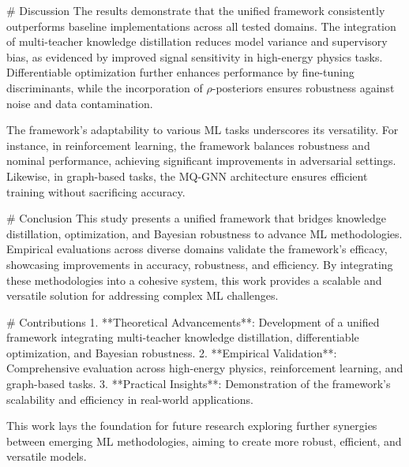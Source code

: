 # Discussion
The results demonstrate that the unified framework consistently outperforms baseline implementations across all tested domains. The integration of multi-teacher knowledge distillation reduces model variance and supervisory bias, as evidenced by improved signal sensitivity in high-energy physics tasks. Differentiable optimization further enhances performance by fine-tuning discriminants, while the incorporation of $ρ$-posteriors ensures robustness against noise and data contamination.

The framework's adaptability to various ML tasks underscores its versatility. For instance, in reinforcement learning, the framework balances robustness and nominal performance, achieving significant improvements in adversarial settings. Likewise, in graph-based tasks, the MQ-GNN architecture ensures efficient training without sacrificing accuracy.

# Conclusion
This study presents a unified framework that bridges knowledge distillation, optimization, and Bayesian robustness to advance ML methodologies. Empirical evaluations across diverse domains validate the framework's efficacy, showcasing improvements in accuracy, robustness, and efficiency. By integrating these methodologies into a cohesive system, this work provides a scalable and versatile solution for addressing complex ML challenges.

# Contributions
1. **Theoretical Advancements**: Development of a unified framework integrating multi-teacher knowledge distillation, differentiable optimization, and Bayesian robustness.
2. **Empirical Validation**: Comprehensive evaluation across high-energy physics, reinforcement learning, and graph-based tasks.
3. **Practical Insights**: Demonstration of the framework's scalability and efficiency in real-world applications.

This work lays the foundation for future research exploring further synergies between emerging ML methodologies, aiming to create more robust, efficient, and versatile models.